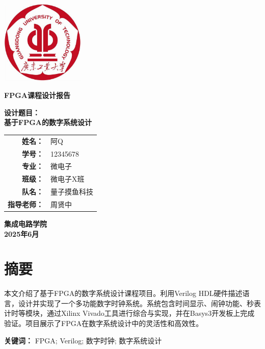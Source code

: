 \documentclass[12pt, a4paper]{book}
\newcommand{\makecover}{
    \thispagestyle{empty}
    \begin{center}
        \vspace*{2cm}
        \includegraphics[width=0.3\textwidth]{figures/logo.png}
        \vskip 2cm
        
        {\Huge \textbf{FPGA课程设计报告}}
        \vskip 1.5cm
        
        {\Large \textbf{设计题目：}}\\
        \vskip 0.5cm
        {\LARGE \textbf{基于FPGA的数字系统设计}}
        \vskip 2cm
        
        {\large 
            \begin{tabular}{rl}
                \textbf{姓\hspace{1em}名：} & 阿Q \\
                \textbf{学\hspace{1em}号：} & 12345678 \\
                \textbf{专\hspace{1em}业：} & 微电子 \\
                \textbf{班\hspace{1em}级：} & 微电子X班 \\
                \textbf{队\hspace{1em}名：} & 量子摸鱼科技 \\
                \textbf{指导老师：} & 周贤中 \\
            \end{tabular}
        }
        \vskip 2cm
        
        {\Large \textbf{集成电路学院}}\\
        \vskip 0.5cm
        {\Large \textbf{2025年6月}}
    \end{center}
    \cleardoublepage
}
\begin{document}
\makecover

\frontmatter
\chapter*{摘要}
本文介绍了基于FPGA的数字系统设计课程项目。利用Verilog HDL硬件描述语言，设计并实现了一个多功能数字时钟系统。系统包含时间显示、闹钟功能、秒表计时等模块，通过Xilinx Vivado工具进行综合与实现，并在Basys3开发板上完成验证。项目展示了FPGA在数字系统设计中的灵活性和高效性。

\textbf{关键词：} FPGA; Verilog; 数字时钟; 数字系统设计

\tableofcontents

\mainmatter












\end{document}
